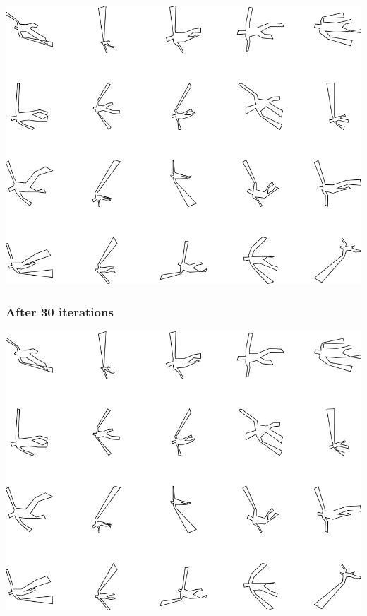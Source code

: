 \includegraphics[width=6in]{output/3.learning/concentration/concentration_psw1000000_iter20_.png}
\subsubsection{After 30 iterations}

\includegraphics[width=6in]{output/3.learning/concentration/concentration_psw1000000_iter30_.png}
